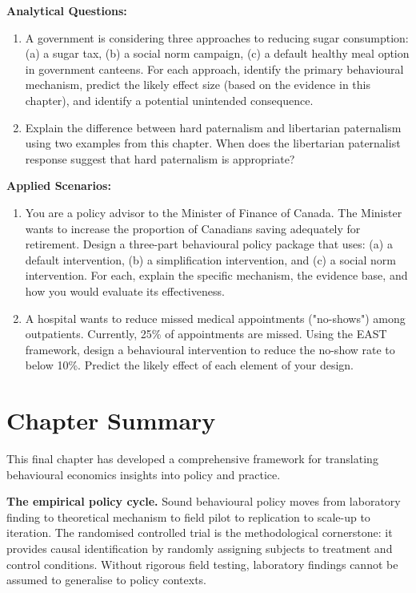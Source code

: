 \documentclass[12pt, letterpaper]{article}
\begin{document}
\textbf{Analytical Questions:}
\begin{enumerate}
\item A government is considering three approaches to reducing sugar consumption: (a) a sugar tax, (b) a social norm campaign, (c) a default healthy meal option in government canteens. For each approach, identify the primary behavioural mechanism, predict the likely effect size (based on the evidence in this chapter), and identify a potential unintended consequence.
\item Explain the difference between hard paternalism and libertarian paternalism using two examples from this chapter. When does the libertarian paternalist response suggest that hard paternalism is appropriate?
\end{enumerate}

\textbf{Applied Scenarios:}
\begin{enumerate}
\item You are a policy advisor to the Minister of Finance of Canada. The Minister wants to increase the proportion of Canadians saving adequately for retirement. Design a three-part behavioural policy package that uses: (a) a default intervention, (b) a simplification intervention, and (c) a social norm intervention. For each, explain the specific mechanism, the evidence base, and how you would evaluate its effectiveness.
\item A hospital wants to reduce missed medical appointments ("no-shows") among outpatients. Currently, 25\% of appointments are missed. Using the EAST framework, design a behavioural intervention to reduce the no-show rate to below 10\%. Predict the likely effect of each element of your design.
\end{enumerate}

\medskip


\section*{Chapter Summary}


This final chapter has developed a comprehensive framework for translating behavioural economics insights into policy and practice.

\textbf{The empirical policy cycle.} Sound behavioural policy moves from laboratory finding to theoretical mechanism to field pilot to replication to scale-up to iteration. The randomised controlled trial is the methodological cornerstone: it provides causal identification by randomly assigning subjects to treatment and control conditions. Without rigorous field testing, laboratory findings cannot be assumed to generalise to policy contexts.
\end{document}
